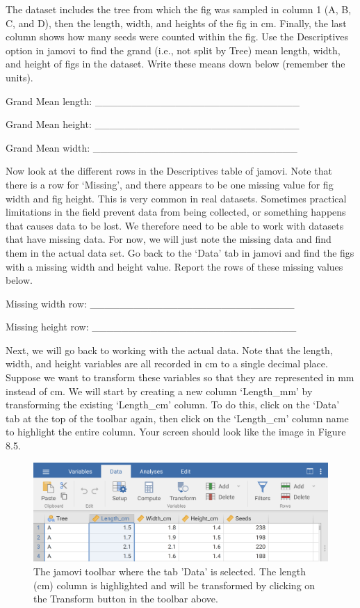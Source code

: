 \documentclass[
  openany]{krantz}
\begin{document}
The dataset includes the tree from which the fig was sampled in column 1 (A, B, C, and D), then the length, width, and heights of the fig in cm.
Finally, the last column shows how many seeds were counted within the fig.
Use the Descriptives option in jamovi to find the grand (i.e., not split by Tree) mean length, width, and height of figs in the dataset.
Write these means down below (remember the units).

Grand Mean length: \_\_\_\_\_\_\_\_\_\_\_\_\_\_\_\_\_\_\_\_\_\_\_\_\_\_\_\_

Grand Mean height: \_\_\_\_\_\_\_\_\_\_\_\_\_\_\_\_\_\_\_\_\_\_\_\_\_\_\_\_

Grand Mean width: \_\_\_\_\_\_\_\_\_\_\_\_\_\_\_\_\_\_\_\_\_\_\_\_\_\_\_\_

Now look at the different rows in the Descriptives table of jamovi.
Note that there is a row for `Missing', and there appears to be one missing value for fig width and fig height.
This is very common in real datasets.
Sometimes practical limitations in the field prevent data from being collected, or something happens that causes data to be lost.
We therefore need to be able to work with datasets that have missing data.
For now, we will just note the missing data and find them in the actual data set.
Go back to the `Data' tab in jamovi and find the figs with a missing width and height value.
Report the rows of these missing values below.

Missing width row: \_\_\_\_\_\_\_\_\_\_\_\_\_\_\_\_\_\_\_\_\_\_\_\_\_\_\_\_

Missing height row: \_\_\_\_\_\_\_\_\_\_\_\_\_\_\_\_\_\_\_\_\_\_\_\_\_\_\_\_

Next, we will go back to working with the actual data.
Note that the length, width, and height variables are all recorded in cm to a single decimal place.
Suppose we want to transform these variables so that they are represented in mm instead of cm.
We will start by creating a new column `Length\_mm' by transforming the existing `Length\_cm' column.
To do this, click on the `Data' tab at the top of the toolbar again, then click on the `Length\_cm' column name to highlight the entire column.
Your screen should look like the image in Figure 8.5.

\begin{figure}
\includegraphics[width=1\linewidth]{img/jamovi_transform_fig_length} \caption{The jamovi toolbar where the tab 'Data' is selected. The length (cm) column is highlighted and will be transformed by clicking on the Transform button in the toolbar above.}\label{fig:unnamed-chunk-29}
\end{figure}
\end{document}
